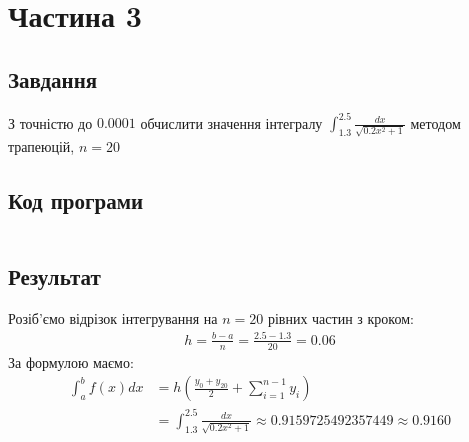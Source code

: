 \section{Частина 3}
\label{sec:task3}

\subsection{Завдання}
\label{subsec:task3_task}

З точністю до $0.0001$ обчислити значення інтегралу
$\int_{1.3}^{2.5} \frac{dx}{\sqrt{0.2x^2 + 1}}$
методом трапеюцій, $n = 20$

\subsection{Код програми}
\label{subsec:task3_code}
\inputminted{python}{../src/task3.py}

\subsection{Результат}
\label{subsec:task3_result}

Розіб'ємо відрізок інтегрування на $n = 20$ рівних частин з кроком:
\begin{align}
    h = \frac{b - a}{n} = \frac{2.5 - 1.3}{20} = 0.06
\end{align}
За формулою маємо:
\begin{align}
    \int_{a}^{b} f(x) dx
     & = h (\frac{y_0 + y_{20}}{2} + \sum_{i = 1}^{n - 1} y_i) \\
     & = \int_{1.3}^{2.5} \frac{dx}{\sqrt{0.2x^2 + 1}}
    \approx 0.9159725492357449
    \approx 0.9160
\end{align}
